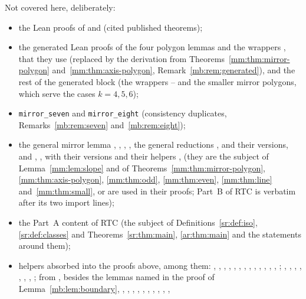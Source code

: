 Not covered here, deliberately:
\begin{itemize}
\item the Lean proofs of  and  (cited published theorems);
\item the generated Lean proofs of the four polygon lemmas and the wrappers ,  that they use
  (replaced by the derivation from Theorems~\ref{mm:thm:mirror-polygon} and~\ref{mm:thm:axis-polygon},
  Remark~\ref{mb:rem:generated}), and the rest of the generated block (the wrappers -- and the
  smaller mirror polygons, which serve the cases $k=4,5,6$);
\item \texttt{mirror\_seven\textquotesingle} and \texttt{mirror\_eight\textquotesingle} (consistency duplicates,
  Remarks~\ref{mb:rem:seven} and~\ref{mb:rem:eight});
\item the general mirror lemma , , ,
  , the general reductions ,  and their
   versions, and , ,  with their  versions
  and their helpers ,  (they are the subject of Lemma~\ref{mm:lem:slope} and of
  Theorems~\ref{mm:thm:mirror-polygon}, \ref{mm:thm:axis-polygon}, \ref{mm:thm:odd}, \ref{mm:thm:even},
  \ref{mm:thm:line} and~\ref{mm:thm:small}, or are used in their proofs; Part~B of RTC is 
  verbatim after its two import lines);
\item the Part~A content of RTC (the subject of Definitions~\ref{sr:def:iso}, \ref{sr:def:classes} and
  Theorems~\ref{sr:thm:main}, \ref{ar:thm:main} and the statements around them);
\item helpers absorbed into the proofs above, among them: , , , ,
  , , , , , ,
  , , , ; ,
  , , , , , ,
  ; from , besides the lemmas named in the proof of
  Lemma~\ref{mb:lem:boundary}, , , , , ,
  , , , , ,

\end{itemize}
